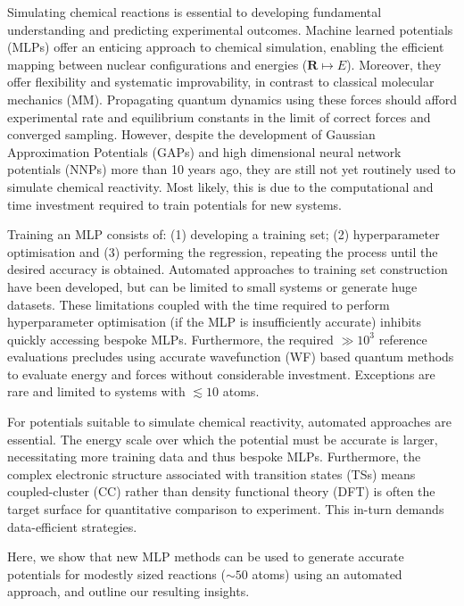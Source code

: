 \documentclass[twoside,twocolumn,9pt]{article}
\begin{document}
Simulating chemical reactions is essential to developing fundamental understanding and predicting experimental outcomes.\cite{Orr-Ewing2017} Machine learned potentials (MLPs) offer an enticing approach to chemical simulation, enabling the efficient mapping between nuclear configurations and energies ($\boldsymbol{R} \mapsto E$). Moreover, they offer flexibility and systematic improvability, in contrast to classical molecular mechanics (MM).\cite{Behler2016} Propagating quantum dynamics using these forces should afford experimental rate and equilibrium constants in the limit of correct forces and converged sampling. However, despite the development of Gaussian Approximation Potentials (GAPs)\cite{Bartk2010, Deringer2021} and high dimensional neural network potentials (NNPs)\cite{Behler2007} more than 10 years ago, they are still not yet routinely used to simulate chemical reactivity.\cite{Ko2020} Most likely, this is due to the computational and time investment required to train potentials for new systems. 

Training an MLP consists of: (1) developing a training set; (2) hyperparameter optimisation and (3) performing the regression, repeating the process until the desired accuracy is obtained. Automated approaches to training set construction have been developed,\cite{Smith2018, Young2021gap, Miksch2021} but can be limited to small systems or generate huge datasets. These limitations coupled with the time required to perform hyperparameter optimisation (if the MLP is insufficiently accurate) inhibits quickly accessing bespoke MLPs. Furthermore, the required $\gg10^3$ reference evaluations precludes using accurate wavefunction (WF) based quantum methods to evaluate energy and forces without considerable investment.\cite{Smith2019} Exceptions are rare and limited to systems with $\lesssim 10$ atoms.\cite{Young2021gap, Dral2020}

For potentials suitable to simulate chemical reactivity, automated approaches are essential. The energy scale over which the potential must be accurate is larger, necessitating more training data and thus bespoke MLPs. Furthermore, the complex electronic structure associated with transition states (TSs) means coupled-cluster (CC) rather than density functional theory (DFT) is often the target surface for quantitative comparison to experiment.\cite{Zhao2005} This in-turn demands data-efficient strategies. 

Here, we show that new MLP methods\cite{Batzner2021, Kovacs2021} can be used to generate accurate potentials for modestly sized reactions ($\sim50$ atoms) using an automated approach, and outline our resulting insights. 
\end{document}
